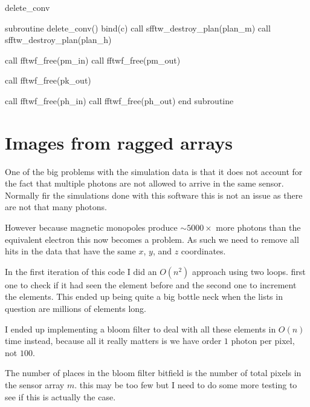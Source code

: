\documentclass[10pt, a4paper]{article}
\begin{document}
\begin{codeblock}{delete_conv}
\begin{code}
subroutine delete_conv() bind(c)
	call sfftw_destroy_plan(plan_m)
	call sfftw_destroy_plan(plan_h)
	
	call fftwf_free(pm_in)
	call fftwf_free(pm_out)
	
	call fftwf_free(pk_out)
	
	call fftwf_free(ph_in)
	call fftwf_free(ph_out)
end subroutine
\end{code}
\end{codeblock}

\section{Images from ragged arrays}

One of the big problems with the simulation data is that it does not account for the fact that multiple photons are not allowed to arrive in the same sensor. Normally fir the simulations done with this software this is not an issue as there are not that many photons. 

However because magnetic monopoles produce $\sim5000\times$ more photons than the equivalent electron this now becomes a problem. 
As such we need to remove all hits in the data that have the same $x$, $y$, and $z$ coordinates.

In the first iteration of this code I did an $O(n^2)$ approach using two loops. first one to check if it had seen the element before and the second one to increment the elements. 
This ended up being quite a big bottle neck when the lists in question are millions of elements long. 

I ended up implementing a bloom filter to deal with all these elements in $O(n)$ time instead, because all it really matters is we have order $1$ photon per pixel, not $100$. 

The number of places in the bloom filter bitfield is the number of total pixels in the sensor array $m$. this may be too few but I need to do some more testing to see if this is actually the case.
\end{document}
